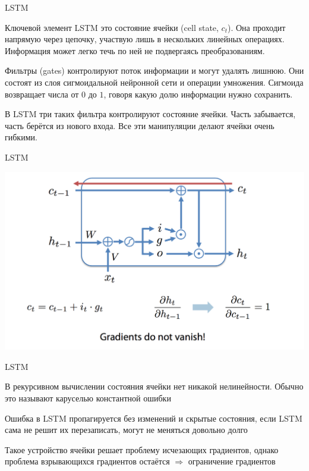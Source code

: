 \documentclass[notes,12pt, aspectratio=169]{beamer}
\newenvironment{wideitemize}{\itemize\addtolength{\itemsep}{10pt}}{\enditemize}
\begin{document}
\begin{frame}{LSTM}
\begin{wideitemize}
	\item  Ключевой элемент LSTM это состояние ячейки (cell state, $c_t$). Она проходит напрямую через цепочку, участвую лишь в нескольких линейных операциях. Информация может легко течь по ней не подвергаясь преобразованиям. 
	
	\item Фильтры (gates) контролируют поток информации и могут удалять лишнюю. Они состоят из слоя сигмоидальной нейронной сети и операции умножения. Сигмоида возвращает числа от $0$ до $1$, говоря какую долю информации нужно сохранить. 
	
	\item В LSTM три таких фильтра контролируют состояние ячейки. Часть забывается, часть берётся из нового входа. Все эти манипуляции делают ячейки очень гибкими. 
\end{wideitemize}
\end{frame}


\begin{frame}{LSTM}
\begin{center}
	\includegraphics[width=.8\linewidth]{lstm7.png}
\end{center}
\end{frame}


\begin{frame}{LSTM}
\begin{wideitemize}
	\item  В рекурсивном вычислении состояния ячейки нет никакой нелинейности. Обычно это называют \alert{каруселью константной ошибки} 
	
	\item Ошибка в LSTM пропагируется без изменений и скрытые состояния, если LSTM сама не решит их перезаписать, могут не меняться довольно долго
	
	\item Такое устройство ячейки решает проблему исчезающих градиентов, однако проблема взрывающихся градиентов остаётся \alert{$\Rightarrow$ ограничение градиентов}
\end{wideitemize}
\end{frame}
\end{document}
